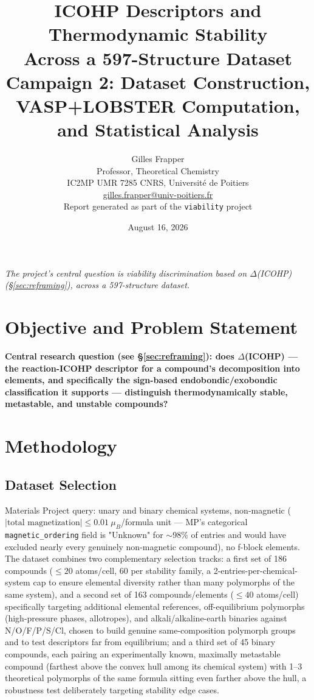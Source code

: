 \documentclass[11pt,a4paper]{article}
\title{\bfseries ICOHP Descriptors and Thermodynamic Stability \\
Across a 597-Structure Dataset \\
\large Campaign 2: Dataset Construction, VASP+LOBSTER Computation,
and Statistical Analysis}
\author{Gilles Frapper \\ Professor, Theoretical Chemistry \\ IC2MP UMR 7285 CNRS, Université de Poitiers \\ \href{mailto:gilles.frapper@univ-poitiers.fr}{gilles.frapper@univ-poitiers.fr}\\[4pt] \small Report generated as part of the \texttt{viability} project}
\date{August 16, 2026}
\begin{document}
\maketitle

\begin{center}
\small\itshape The project's central question is viability
discrimination based on $\Delta$(ICOHP) (\S\ref{sec:reframing}), across
a 597-structure dataset.
\end{center}

\tableofcontents
\newpage

\section{Objective and Problem Statement}

\textbf{Central research question (see \S\ref{sec:reframing}): does
$\Delta$(ICOHP) --- the reaction-ICOHP descriptor for a compound's
decomposition into elements, and specifically the sign-based
endobondic/exobondic classification it supports --- distinguish
thermodynamically stable, metastable, and unstable compounds?}

\section{Methodology}

\subsection{Dataset Selection}

Materials Project query: unary and binary chemical systems,
non-magnetic ($|\text{total magnetization}| \leq 0.01~\mu_B$/formula
unit --- MP's categorical \texttt{magnetic\_ordering} field is
"Unknown" for $\sim$98\% of entries and would have excluded nearly every
genuinely non-magnetic compound), no f-block elements. The dataset
combines two complementary selection tracks: a first set of 186
compounds ($\leq 20$ atoms/cell, 60 per stability family, a
2-entries-per-chemical-system cap to ensure elemental diversity rather
than many polymorphs of the same system), and a second set of 163
compounds/elements ($\leq 40$ atoms/cell) specifically targeting
additional elemental references, off-equilibrium polymorphs
(high-pressure phases, allotropes), and alkali/alkaline-earth binaries
against N/O/F/P/S/Cl, chosen to build genuine same-composition
polymorph groups and to test descriptors far from equilibrium; and a
third set of 45 binary compounds, each pairing an experimentally known,
maximally metastable compound (farthest above the convex hull among
its chemical system) with 1--3 theoretical polymorphs of the same
formula sitting even farther above the hull, a robustness test
deliberately targeting stability edge cases.
\end{document}
